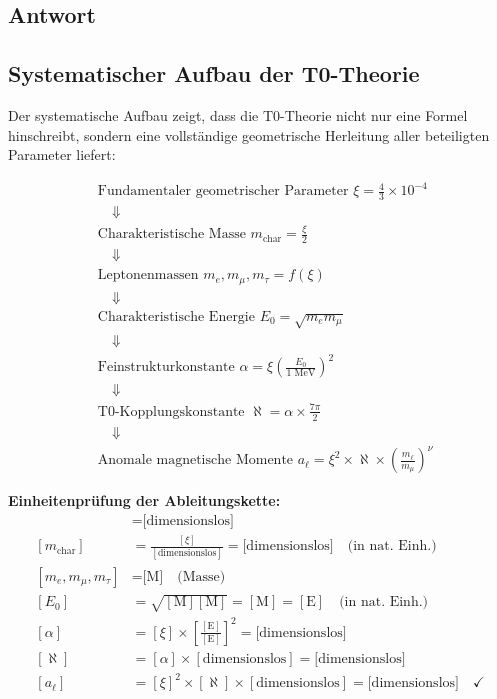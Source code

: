 \documentclass[12pt,a4paper]{article}
\newcommand{\nulep}{\nu}
\newcommand{\mchar}{m_{\text{char}}}
\theoremstyle{remark}
\newenvironment{answer}{\subsection*{Antwort}}{\vspace{1em}}
\begin{document}
\begin{answer}
	\subsection{Systematischer Aufbau der T0-Theorie}
	
	Der systematische Aufbau zeigt, dass die T0-Theorie nicht nur eine Formel hinschreibt, sondern eine vollständige geometrische Herleitung aller beteiligten Parameter liefert:
	
	\begin{align}
		&\text{Fundamentaler geometrischer Parameter } \xi = \frac{4}{3} \times 10^{-4} \\
		&\quad \Downarrow \\
		&\text{Charakteristische Masse } \mchar = \frac{\xi}{2} \\
		&\quad \Downarrow \\
		&\text{Leptonenmassen } m_e, m_\mu, m_\tau = f(\xi) \\
		&\quad \Downarrow \\
		&\text{Charakteristische Energie } E_0 = \sqrt{m_e m_\mu} \\
		&\quad \Downarrow \\
		&\text{Feinstrukturkonstante } \alpha = \xi \left(\frac{E_0}{1\text{ MeV}}\right)^2 \\
		&\quad \Downarrow \\
		&\text{T0-Kopplungskonstante } \aleph = \alpha \times \frac{7\pi}{2} \\
		&\quad \Downarrow \\
		&\text{Anomale magnetische Momente } a_\ell = \xi^2 \times \aleph \times \left(\frac{m_\ell}{m_\mu}\right)^\nulep
	\end{align}
	
	\begin{units}
		\textbf{Einheitenprüfung der Ableitungskette:}
		\begin{align}
			[\xi] &= \text{[dimensionslos]} \\
			[\mchar] &= \frac{[\xi]}{[\text{dimensionslos}]} = \text{[dimensionslos]} \quad \text{(in nat. Einh.)} \\
			[m_e, m_\mu, m_\tau] &= \text{[M]} \quad \text{(Masse)} \\
			[E_0] &= \sqrt{[\text{M}][\text{M}]} = [\text{M}] = [\text{E}] \quad \text{(in nat. Einh.)} \\
			[\alpha] &= [\xi] \times \left[\frac{[\text{E}]}{[\text{E}]}\right]^2 = \text{[dimensionslos]} \\
			[\aleph] &= [\alpha] \times [\text{dimensionslos}] = \text{[dimensionslos]} \\
			[a_\ell] &= [\xi]^2 \times [\aleph] \times [\text{dimensionslos}] = \text{[dimensionslos]} \quad \checkmark
		\end{align}
	\end{units}
	

\end{answer}
\end{document}
